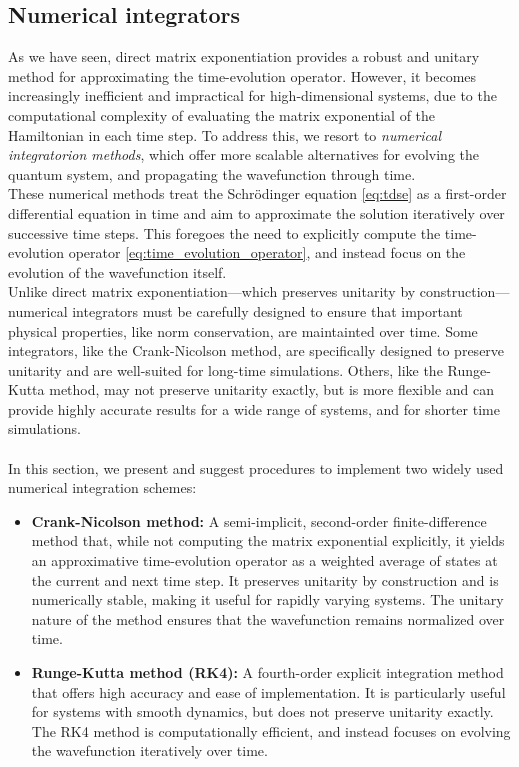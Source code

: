 \documentclass{subfiles}
\begin{document}
\subsection{Numerical integrators}
As we have seen, direct matrix exponentiation provides a robust and unitary method for approximating the time-evolution operator. However, it becomes increasingly inefficient and impractical for high-dimensional systems, due to the computational complexity of evaluating the matrix exponential of the Hamiltonian in each time step. To address this, we resort to \emph{numerical integratorion methods}, which offer more scalable alternatives for evolving the quantum system, and propagating the wavefunction through time.  \\

These numerical methods treat the Schrödinger equation \eqref{eq:tdse} as a first-order differential equation in time and aim to approximate the solution iteratively over successive time steps. This foregoes the need to explicitly compute the time-evolution operator \eqref{eq:time_evolution_operator}, and instead focus on the evolution of the wavefunction itself. \\


Unlike direct matrix exponentiation—which preserves unitarity by construction—numerical integrators must be carefully designed to ensure that important physical properties, like norm conservation, are maintainted over time. Some integrators, like the Crank-Nicolson method, are specifically designed to preserve unitarity and are well-suited for long-time simulations. Others, like the Runge-Kutta method, may not preserve unitarity exactly, but is more flexible and can provide highly accurate results for a wide range of systems, and for shorter time simulations. \\ \\ In this section, we present and suggest procedures to implement two widely used numerical integration schemes:
\begin{itemize}
    \item \textbf{Crank-Nicolson method:} A semi-implicit, second-order finite-difference method that, while not computing the matrix exponential explicitly, it yields an approximative time-evolution operator as a weighted average of states at the current and next time step. It preserves unitarity by construction and is numerically stable, making it useful for rapidly varying systems. The unitary nature of the method ensures that the wavefunction remains normalized over time.
    \item \textbf{Runge-Kutta method (RK4):} A fourth-order explicit integration method that offers high accuracy and ease of implementation. It is particularly useful for systems with smooth dynamics, but does not preserve unitarity exactly. The RK4 method is computationally efficient, and instead focuses on evolving the wavefunction iteratively over time.
\end{itemize}
\end{document}
